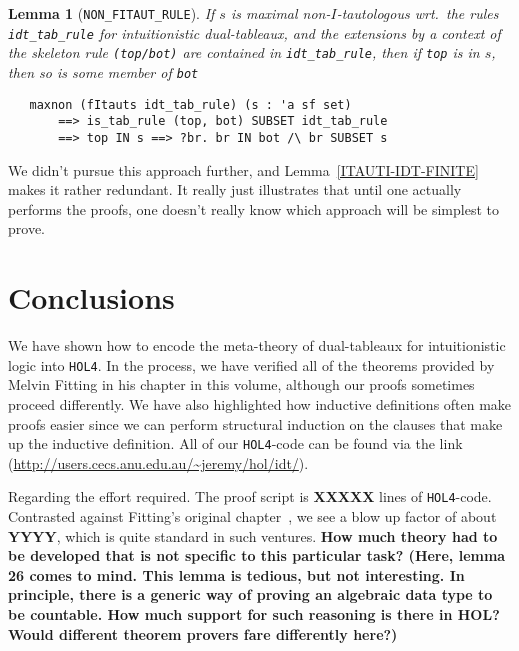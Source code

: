 \documentclass[a4paper]{article}
\newtheorem{lemma}{Lemma}
\newcommand{\hol}{\texttt{HOL4}}
\begin{document}
\begin{lemma}[\texttt{NON\_FITAUT\_RULE}]

  If $s$ is maximal non-$I$-tautologous wrt.\ the rules \texttt{idt\_tab\_rule}
  for intuitionistic dual-tableaux, 
  and the extensions by a context of the skeleton rule
  \texttt{(top/bot)} are contained
  in \texttt{idt\_tab\_rule}, then if \texttt{top} is in $s$,
  then so is some member of \texttt{bot} 

\begin{verbatim}
   maxnon (fItauts idt_tab_rule) (s : 'a sf set) 
       ==> is_tab_rule (top, bot) SUBSET idt_tab_rule 
       ==> top IN s ==> ?br. br IN bot /\ br SUBSET s
\end{verbatim}
\end{lemma}

We didn't pursue this approach further,
and Lemma~\ref{ITAUTI-IDT-FINITE} 
makes it rather redundant.
It really just illustrates that until one actually performs the proofs,
one doesn't really know which approach will be simplest to prove.

\section{Conclusions}

We have shown how to encode the meta-theory of dual-tableaux for
intuitionistic logic into \hol. In the process, we have verified all
of the theorems provided by Melvin Fitting in his chapter in this
volume, although our proofs sometimes proceed differently. We have
also highlighted how inductive definitions often make proofs easier
since we can perform structural induction on the clauses that make up
the inductive definition. All of our \hol-code
can be found via the link (\url{http://users.cecs.anu.edu.au/~jeremy/hol/idt/}).


Regarding the effort required. 
The proof script is \textbf{XXXXX} lines of \hol-code.
Contrasted against Fitting's original
chapter~\cite{fitting-dual-tableau}, we see a blow up factor of about
\textbf{YYYY}, which is quite standard in such ventures.
\textbf{How much theory had to be developed that is not specific to this
particular task? (Here, lemma 26 comes to mind. This lemma is tedious, but not
interesting. In principle, there is a generic way of proving an algebraic data
type to be countable. How much support for such reasoning is there in HOL?
Would different theorem provers fare differently here?)}
\end{document}
